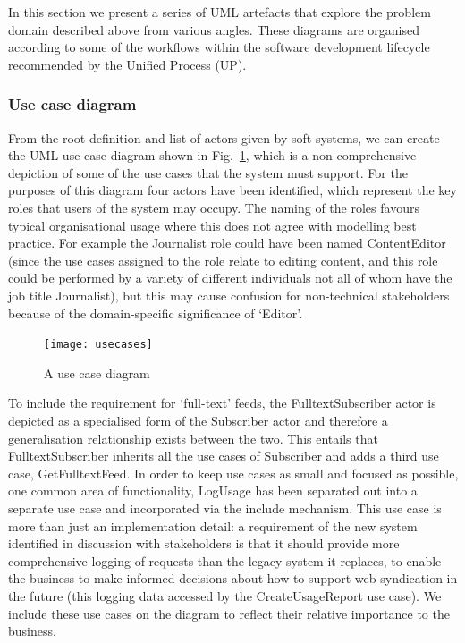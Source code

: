 \documentclass[runningheads,a4paper]{llncs}
\begin{document}
In this section we present a series of UML \cite{omg2011} artefacts that explore the problem domain described above from various angles. These diagrams are organised according to some of the workflows within the software development lifecycle recommended by the Unified Process (UP).


\subsubsection{Use case diagram}

From the root definition and list of actors given by soft systems, we can create the UML use case diagram shown in Fig.~\ref{fig:use-cases}, which is a non-comprehensive depiction of some of the use cases that the system must support. For the purposes of this diagram four actors have been identified, which represent the key roles that users of the system may occupy. The naming of the roles favours typical organisational usage where this does not agree with modelling best practice. For example the \textsf{Journalist} role could have been named \textsf{ContentEditor} (since the use cases assigned to the role relate to editing content, and this role could be performed by a variety of different individuals not all of whom have the job title \textsf{Journalist}), but this may cause confusion for non-technical stakeholders because of the domain-specific significance of `Editor'.

\begin{figure}
\centering
\texttt{[image: usecases]}
\caption{A use case diagram}
\label{fig:use-cases}
\end{figure}

To include the requirement for `full-text' feeds, the \textsf{FulltextSubscriber} actor is depicted as a specialised form of the \textsf{Subscriber} actor and therefore a generalisation relationship exists between the two. This entails that \textsf{FulltextSubscriber} inherits all the use cases of \textsf{Subscriber} and adds a third use case, \textsf{GetFulltextFeed}. In order to keep use cases as small and focused as possible, one common area of functionality, \textsf{LogUsage} has been separated out into a separate use case and incorporated via the \textsf{include} mechanism. This use case is more than just an implementation detail: a requirement of the new system identified in discussion with stakeholders is that it should provide more comprehensive logging of requests than the legacy system it replaces, to enable the business to make informed decisions about how to support web syndication in the future (this logging data accessed by the \textsf{CreateUsageReport} use case). We include these use cases on the diagram to reflect their relative importance to the business.
\end{document}
